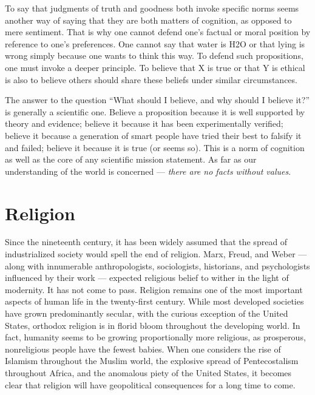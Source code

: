 \documentclass[a4paper,14pt]{extarticle}
\begin{document}
To say that judgments of truth and goodness both invoke specific norms seems another way of saying that they are both matters of cognition, as opposed to mere sentiment.
That is why one cannot defend one’s factual or moral position by reference to one’s preferences.
One cannot say that water is H2O or that lying is wrong simply because one wants to think this way.
To defend such propositions, one must invoke a deeper principle.
To believe that X is true or that Y is ethical is also to believe others should share these beliefs under similar circumstances.

The answer to the question ``What should I believe, and why should I believe it?'' is generally a scientific one.
Believe a proposition because it is well supported by theory and evidence;
believe it because it has been experimentally verified;
believe it because a generation of smart people have tried their best to falsify it and failed;
believe it because it is true (or seems so).
This is a norm of cognition as well as the core of any scientific mission statement.
As far as our understanding of the world is concerned --- \textit{there are no facts without values}.

\newpage
\section{Religion}

Since the nineteenth century, it has been widely assumed that the spread of industrialized society would spell the end of religion.
Marx, Freud, and Weber --- along with innumerable anthropologists, sociologists, historians, and psychologists influenced by their work --- expected religious belief to wither in the light of modernity.
It has not come to pass.
Religion remains one of the most important aspects of human life in the twenty-first century.
While most developed societies have grown predominantly secular, with the curious exception of the United States, orthodox religion is in florid bloom throughout the developing world.
In fact, humanity seems to be growing proportionally more religious, as prosperous, nonreligious people have the fewest babies.
When one considers the rise of Islamism throughout the Muslim world, the explosive spread of Pentecostalism throughout Africa, and the anomalous piety of the United States, it becomes clear that religion will have geopolitical consequences for a long time to come.
\end{document}
